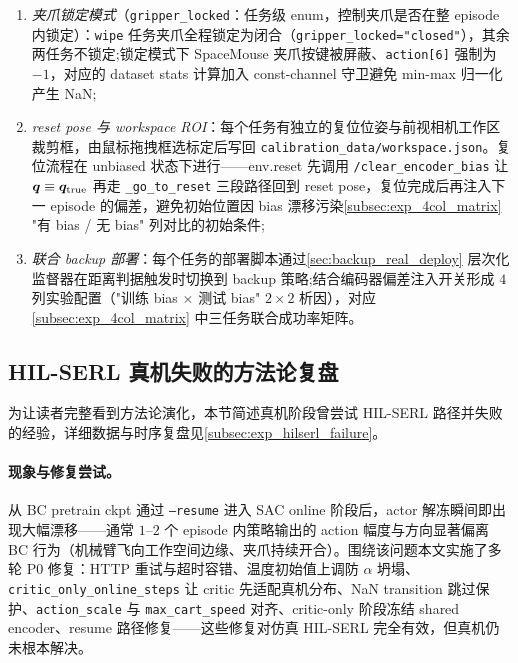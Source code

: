 \begin{enumerate}
  \item \emph{夹爪锁定模式}（\texttt{gripper\_locked}：任务级 enum，控制夹爪是否在整 episode 内锁定）：\texttt{wipe} 任务夹爪全程锁定为闭合（\texttt{gripper\_locked="closed"}），其余两任务不锁定;锁定模式下 SpaceMouse 夹爪按键被屏蔽、\texttt{action[6]} 强制为 $-1$，对应的 dataset stats 计算加入 const-channel 守卫避免 min-max 归一化产生 NaN;
  \item \emph{reset pose 与 workspace ROI}：每个任务有独立的复位位姿与前视相机工作区裁剪框，由鼠标拖拽框选标定后写回 \texttt{calibration\_data/workspace.json}。复位流程在 unbiased 状态下进行——env.reset 先调用 \texttt{/clear\_encoder\_bias} 让 $\bm{q} \equiv \bm{q}_\text{true}$ 再走 \texttt{\_go\_to\_reset} 三段路径回到 reset pose，复位完成后再注入下一 episode 的偏差，避免初始位置因 bias 漂移污染\cref{subsec:exp_4col_matrix} "有 bias / 无 bias" 列对比的初始条件;
  \item \emph{联合 backup 部署}：每个任务的部署脚本通过\cref{sec:backup_real_deploy} 层次化监督器在距离判据触发时切换到 backup 策略;结合编码器偏差注入开关形成 $4$ 列实验配置（"训练 bias $\times$ 测试 bias" $2\times2$ 析因），对应\cref{subsec:exp_4col_matrix} 中三任务联合成功率矩阵。
\end{enumerate}

\subsection{HIL-SERL 真机失败的方法论复盘}\label{subsec:hilserl_failure}

为让读者完整看到方法论演化，本节简述真机阶段曾尝试 HIL-SERL 路径并失败的经验，详细数据与时序复盘见\cref{subsec:exp_hilserl_failure}。

\paragraph{现象与修复尝试。}从 BC pretrain ckpt 通过 \texttt{--resume} 进入 SAC online 阶段后，actor 解冻瞬间即出现大幅漂移——通常 $1$–$2$ 个 episode 内策略输出的 action 幅度与方向显著偏离 BC 行为（机械臂飞向工作空间边缘、夹爪持续开合）。围绕该问题本文实施了多轮 P0 修复：HTTP 重试与超时容错、温度初始值上调防 $\alpha$ 坍塌、\texttt{critic\_only\_online\_steps} 让 critic 先适配真机分布、NaN transition 跳过保护、\texttt{action\_scale} 与 \texttt{max\_cart\_speed} 对齐、critic-only 阶段冻结 shared encoder、resume 路径修复——这些修复对仿真 HIL-SERL 完全有效，但真机仍未根本解决。


